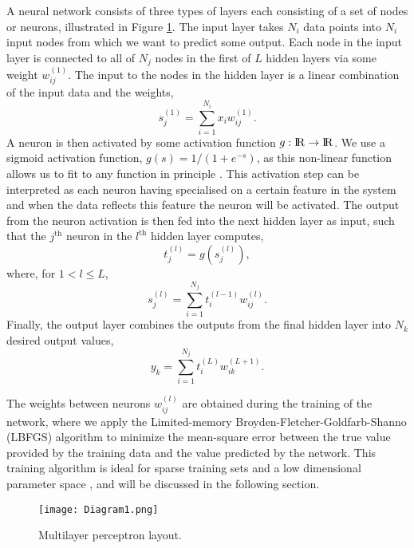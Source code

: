 \documentclass[useAMS,usenatbib]{mnras}
\newcommand{\REAL}{{\rm I\!R}}
\begin{document}
A neural network consists of three types of layers each consisting of a set of nodes or neurons, illustrated in Figure \ref{fig: Neural Network architecture}.   
The input layer takes $N_i$ data points into $N_i$ input nodes from which we want to predict some output.
Each node in the input layer is connected to all of $N_j$ nodes in the first of $L$ hidden layers via some weight $w^{(1)}_{ij}$.
The input to the nodes in the hidden layer is a linear combination of the input data and the weights,
\begin{equation}
s^{(1)}_j = \sum\limits_{i = 1}^{N_i} x_i w^{(1)}_{ij}.
\end{equation}
A neuron is then activated by some activation function $g: \REAL \rightarrow \REAL$. 
We use a sigmoid activation function, $g(s) = 1/(1+e^{-s})$, as this non-linear function allows us to fit to any function in principle \citep{Cybenko1989}. 
This activation step can be interpreted as each neuron having specialised on a certain feature in the system \citep{Bishop2006,Gal2016Uncertainty} and when the data reflects this feature the neuron will be activated.
The output from the neuron activation is then fed into the next hidden layer as input, such that the $j^\text{th}$ neuron in the $l^\text{th}$ hidden layer  computes,
\begin{equation}\label{eq: definition t}
t^{(l)}_j = g\left(s^{(l)}_j\right),
\end{equation}
where, for $1<l\leq L$,
\begin{equation}\label{eq: definition s}
s^{(l)}_j = \sum\limits_{i = 1}^{N_j}t^{(l-1)}_i w^{(l)}_{ij}.
\end{equation}
Finally, the output layer combines the outputs from the final hidden layer into $N_k$ desired output values,
\begin{equation}
y_k = \sum\limits_{i = 1}^{N_j}t^{(L)}_i w^{(L+1)}_{ik}.
\end{equation}

The weights between neurons $w^{(l)}_{ij}$ are obtained during the training of the network, where we apply the Limited-memory Broyden-Fletcher-Goldfarb-Shanno (LBFGS) algorithm \citep{Press2007} to minimize the mean-square error between the true value provided by the training data and the value predicted by the network. 
This training algorithm is ideal for sparse training sets and a low dimensional parameter space \citep{Le2011}, and will be discussed in the following section.
\begin{figure}
\texttt{[image: Diagram1.png]}
\caption{Multilayer perceptron layout.}
\label{fig: Neural Network architecture}
\end{figure}
\end{document}
